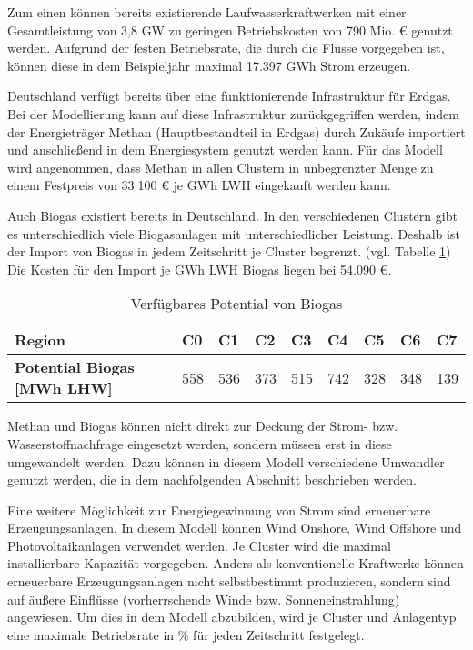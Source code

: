 Zum einen können bereits existierende Laufwasserkraftwerken mit einer Gesamtleistung von 3,8 GW zu geringen Betriebskosten von 790 Mio. € genutzt werden. Aufgrund der festen Betriebsrate, die durch die Flüsse vorgegeben ist, können diese in dem Beispieljahr maximal 17.397 GWh Strom erzeugen.

Deutschland verfügt bereits über eine funktionierende Infrastruktur für Erdgas. Bei der Modellierung kann auf diese Infrastruktur zurückgegriffen werden, indem der Energieträger Methan (Hauptbestandteil in Erdgas) durch Zukäufe importiert und anschließend in dem Energiesystem genutzt werden kann. Für das Modell wird angenommen, dass Methan in allen Clustern in unbegrenzter Menge zu einem Festpreis von 33.100 € je GWh LWH eingekauft werden kann.

Auch Biogas existiert bereits in Deutschland. In den verschiedenen Clustern gibt es unterschiedlich viele Biogasanlagen mit unterschiedlicher Leistung. Deshalb ist der Import von Biogas in jedem Zeitschritt je Cluster begrenzt. (vgl. Tabelle \ref{tab:biogasgas}) Die Kosten für den Import je GWh LWH Biogas liegen bei 54.090 €. 

\begin{table}[!ht]
    \centering
    \begin{tabular}{|l|l|l|l|l|l|l|l|l|}
    \hline
    \textbf{Region}                     & C0  & C1  & C2  & C3  & C4  & C5  & C6  & C7  \\ \hline
    \textbf{Potential Biogas [MWh LHW]} & 558 & 536 & 373 & 515 & 742 & 328 & 348 & 139 \\ \hline
    \end{tabular}
    \caption{Verfügbares Potential von Biogas}
    \label{tab:biogasgas}
\end{table}

Methan und Biogas können nicht direkt zur Deckung der Strom- bzw. Wasserstoffnachfrage eingesetzt werden, sondern müssen erst in diese umgewandelt werden. Dazu können in diesem Modell verschiedene Umwandler genutzt werden, die in dem nachfolgenden Abschnitt beschrieben werden.

Eine weitere Möglichkeit zur Energiegewinnung von Strom sind erneuerbare Erzeugungsanlagen. In diesem Modell können Wind Onshore, Wind Offshore und Photovoltaikanlagen verwendet werden. Je Cluster wird die maximal installierbare Kapazität vorgegeben. 
Anders als konventionelle Kraftwerke können erneuerbare Erzeugungsanlagen nicht selbstbestimmt produzieren, sondern sind auf äußere Einflüsse (vorherrschende Winde bzw. Sonneneinstrahlung) angewiesen. Um dies in dem Modell abzubilden, wird je Cluster und Anlagentyp eine maximale Betriebsrate in \% für jeden Zeitschritt festgelegt. 


